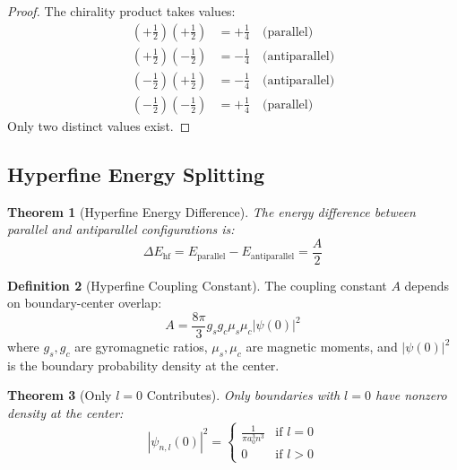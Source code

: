 \documentclass[twocolumn,10pt,a4paper]{article}
\newtheorem{theorem}{Theorem}[section]
\theoremstyle{definition}
\newtheorem{definition}[theorem]{Definition}
\theoremstyle{remark}
\begin{document}
\begin{proof}
The chirality product takes values:
\begin{align}
    (+\tfrac{1}{2})(+\tfrac{1}{2}) &= +\tfrac{1}{4} \quad \text{(parallel)} \\
    (+\tfrac{1}{2})(-\tfrac{1}{2}) &= -\tfrac{1}{4} \quad \text{(antiparallel)} \\
    (-\tfrac{1}{2})(+\tfrac{1}{2}) &= -\tfrac{1}{4} \quad \text{(antiparallel)} \\
    (-\tfrac{1}{2})(-\tfrac{1}{2}) &= +\tfrac{1}{4} \quad \text{(parallel)}
\end{align}
Only two distinct values exist.
\end{proof}

\subsection{Hyperfine Energy Splitting}

\begin{theorem}[Hyperfine Energy Difference]
\label{thm:hyperfine}
The energy difference between parallel and antiparallel configurations is:
\begin{equation}
    \Delta E_{\text{hf}} = E_{\text{parallel}} - E_{\text{antiparallel}} = \frac{A}{2}
\end{equation}
\end{theorem}

\begin{definition}[Hyperfine Coupling Constant]
The coupling constant $A$ depends on boundary-center overlap:
\begin{equation}
    A = \frac{8\pi}{3} g_s g_c \mu_s \mu_c |\psi(0)|^2
\end{equation}
where $g_s, g_c$ are gyromagnetic ratios, $\mu_s, \mu_c$ are magnetic moments, and $|\psi(0)|^2$ is the boundary probability density at the center.
\end{definition}

\begin{theorem}[Only $l = 0$ Contributes]
\label{thm:s_hyperfine}
Only boundaries with $l = 0$ have nonzero density at the center:
\begin{equation}
    |\psi_{n,l}(0)|^2 = \begin{cases}
        \frac{1}{\pi a_0^3 n^3} & \text{if } l = 0 \\
        0 & \text{if } l > 0
    \end{cases}
\end{equation}
\end{theorem}
\end{document}
